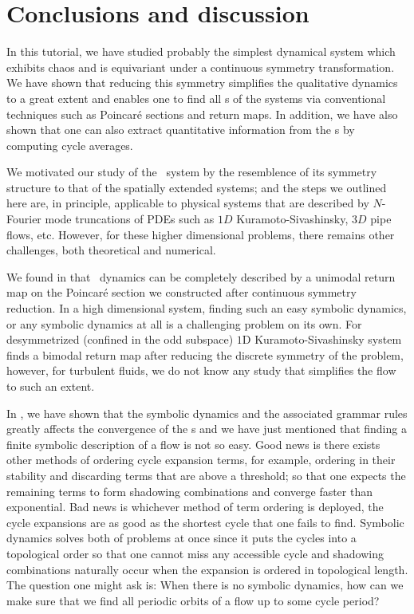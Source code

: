 \section{Conclusions and discussion}
\label{s:concl}

In this tutorial, we have studied probably the simplest dynamical system which 
exhibits chaos and is equivariant under a continuous symmetry transformation.
We have shown that reducing this symmetry simplifies the qualitative dynamics 
to a great extent and enables one to find all \rpo s of the systems via 
conventional techniques such as Poincar\'e sections and return maps. In 
addition, we have also shown that one can also extract quantitative information 
from the \rpo s by computing cycle averages. 

We motivated our study of the \twomode\ system by the resemblence of its 
symmetry structure to that of the spatially extended systems; and the steps we 
outlined here are, in principle, applicable to physical systems that are 
described by $N$-Fourier mode truncations of PDEs such as $1D$ 
Kuramoto-Sivashinsky, $3D$ pipe flows, etc. However, 
for these higher dimensional problems, there remains other challenges, both 
theoretical and numerical. 

We found in  that \twomode\ dynamics can be completely 
described by a unimodal return map on the Poincar\'e section we constructed 
after continuous symmetry reduction. In a high dimensional system, finding such 
an easy symbolic dynamics, or any symbolic dynamics at all is a challenging 
problem on its own. For desymmetrized (confined in the odd subspace) $1$D 
Kuramoto-Sivashinsky system  finds a bimodal return map after 
reducing the discrete symmetry of the problem, however, for turbulent fluids, 
we do not know any study that simplifies the flow to such an extent.

In , we have shown that the symbolic dynamics and the 
associated grammar rules greatly affects the convergence of the \cycForm s and 
we have just mentioned that finding a finite symbolic description of a flow is 
not so easy. Good news is there exists other methods of ordering cycle 
expansion terms, for example, ordering in their stability and discarding terms
that are above a threshold; so that one expects the remaining terms to form
shadowing combinations and converge faster than exponential. Bad news is 
whichever method of term ordering is deployed, the cycle expansions are as good
as the shortest cycle that one fails to find. Symbolic dynamics solves both 
of problems at once since it puts the cycles into a topological order so that 
one cannot miss any accessible cycle and shadowing combinations naturally occur
when the expansion is ordered in topological length. The question one might ask 
is: When there is no symbolic dynamics, how can we make sure that we find all 
periodic orbits of a flow up to some cycle period? 

